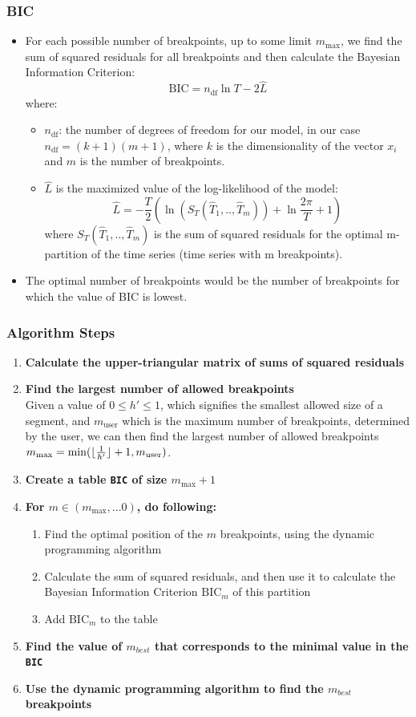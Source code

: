 \documentclass[presentation.tex]{subfiles}
\begin{document}
\begin{frame}
  \frametitle{BIC}
 \begin{itemize}
 \item 
   For each possible number of breakpoints, up to some
   limit $m_{\text{max}}$, we find the sum of squared residuals for all breakpoints
   and then calculate the Bayesian Information Criterion:
   \[
   \text{BIC} = n_{\text{df}} \ln{T} - 2 {\hat{L}}
   \]
   where:
   \begin{itemize}
   \item $n_{\text{df}}$: the number of degrees of freedom for our model, in our case
     $n_{\text{df}} = (k + 1) (m + 1)$, where $k$ is the dimensionality of the vector $x_i$ and
     $m$ is the number of breakpoints.
   \item $\hat{L}$ is the maximized value of the log-likelihood of the model:
     \[
     \hat{L} = -\frac{T}{2} \left(\ln \left(S_T(\hat{T}_1,..,\hat{T}_m)\right)
     + \ln{\frac{2\pi}{T}} + 1\right)
     \]
     where $S_T(\hat{T}_1,..,\hat{T}_m)$ is the sum of squared residuals for the
     optimal m-partition of the time series (time series with m breakpoints). 
   \end{itemize}
 \item 
   The optimal number of breakpoints would be the number of breakpoints for which
   the value of BIC is lowest.
 \end{itemize} 
\end{frame}


\begin{frame}
  \frametitle{Algorithm Steps}
  \begin{enumerate}
\item \textbf{Calculate the upper-triangular matrix of sums of squared residuals}
\item \textbf{Find the largest number of allowed breakpoints}\\
  Given a value of $0\leq h' \leq 1$, which signifies the smallest allowed size of
  a segment, and $m_{\text{user}}$ which is the maximum number of breakpoints, determined by the user, 
  we can then find the largest number of allowed
  breakpoints $m_{\text{max}} = \min(\lfloor\frac{1}{h'}\rfloor + 1, m_{\text{user}})$.
\item \textbf{Create a table \texttt{BIC} of size $m_{\text{max}} + 1$}
\item \textbf{For $m \in (m_{\text{max}}, ... 0)$, do following:}
  \begin{enumerate}
  \item Find the optimal position of the $m$ breakpoints, using the dynamic programming algorithm
  \item Calculate the sum of squared residuals, and then use it to
    calculate the Bayesian Information Criterion $\text{BIC}_m$ of this
    partition
  \item Add $\text{BIC}_m$ to the table
  \end{enumerate}
\item \textbf{Find the value of $m_{best}$ that corresponds to the minimal value in the \texttt{BIC}}
\item \textbf{Use the dynamic programming algorithm to find the $m_{best}$ breakpoints}
\end{enumerate}
\end{frame}
\end{document}
